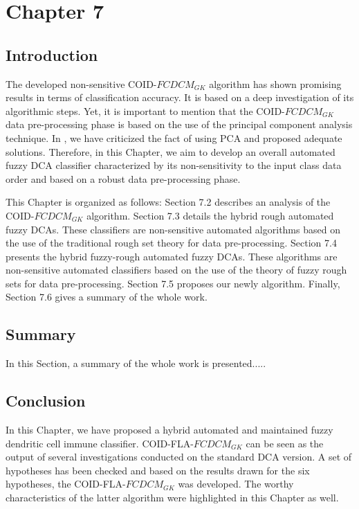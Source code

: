\chapter{Chapter 7}
\section{Introduction}
The developed non-sensitive COID-$FCDCM_{GK}$ algorithm has shown promising results in terms of classification accuracy. It is based on a deep investigation of its algorithmic steps. Yet, it is important to mention that the COID-$FCDCM_{GK}$ data pre-processing phase    is based on the use of the principal component analysis technique. In \cite{RCDCA, RSTDCA}, we have criticized the fact of using PCA and proposed adequate solutions. Therefore, in this Chapter, we aim to develop an overall automated fuzzy DCA  classifier characterized by its non-sensitivity to the input class data order and based on a robust data pre-processing phase.  

This Chapter is organized as follows: Section 7.2 describes  an analysis of the COID-$FCDCM_{GK}$ algorithm. Section 7.3 details the hybrid rough automated fuzzy DCAs. These classifiers are non-sensitive automated algorithms based on the use of the traditional  rough set theory for data pre-processing. Section 7.4 presents the hybrid fuzzy-rough automated fuzzy DCAs. These algorithms are non-sensitive automated classifiers based on the use of the theory of fuzzy rough sets for data pre-processing. Section 7.5 proposes  our newly algorithm. Finally,  Section 7.6 gives a summary of the whole work.

\section{Summary}
In this Section, a summary of the whole work is presented.....
\section{Conclusion}
In this Chapter, we have proposed a hybrid automated and maintained fuzzy dendritic cell immune classifier.  COID-FLA-$FCDCM_{GK}$ can be seen as the output of several investigations conducted on the standard DCA version. A set of hypotheses has been checked and based on the results drawn for the six hypotheses, the COID-FLA-$FCDCM_{GK}$ was developed. The worthy characteristics of the latter algorithm were highlighted in this Chapter as well.





